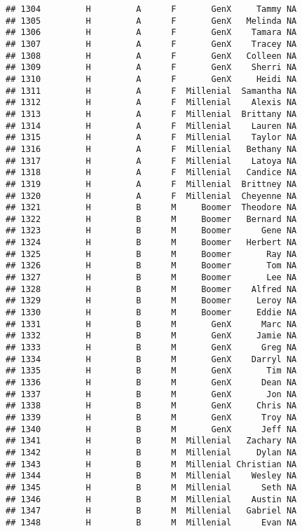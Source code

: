 \documentclass[
]{article}
\begin{document}
\begin{verbatim}
## 1304         H         A      F       GenX     Tammy NA
## 1305         H         A      F       GenX   Melinda NA
## 1306         H         A      F       GenX    Tamara NA
## 1307         H         A      F       GenX    Tracey NA
## 1308         H         A      F       GenX   Colleen NA
## 1309         H         A      F       GenX    Sherri NA
## 1310         H         A      F       GenX     Heidi NA
## 1311         H         A      F  Millenial  Samantha NA
## 1312         H         A      F  Millenial    Alexis NA
## 1313         H         A      F  Millenial  Brittany NA
## 1314         H         A      F  Millenial    Lauren NA
## 1315         H         A      F  Millenial    Taylor NA
## 1316         H         A      F  Millenial   Bethany NA
## 1317         H         A      F  Millenial    Latoya NA
## 1318         H         A      F  Millenial   Candice NA
## 1319         H         A      F  Millenial  Brittney NA
## 1320         H         A      F  Millenial  Cheyenne NA
## 1321         H         B      M     Boomer  Theodore NA
## 1322         H         B      M     Boomer   Bernard NA
## 1323         H         B      M     Boomer      Gene NA
## 1324         H         B      M     Boomer   Herbert NA
## 1325         H         B      M     Boomer       Ray NA
## 1326         H         B      M     Boomer       Tom NA
## 1327         H         B      M     Boomer       Lee NA
## 1328         H         B      M     Boomer    Alfred NA
## 1329         H         B      M     Boomer     Leroy NA
## 1330         H         B      M     Boomer     Eddie NA
## 1331         H         B      M       GenX      Marc NA
## 1332         H         B      M       GenX     Jamie NA
## 1333         H         B      M       GenX      Greg NA
## 1334         H         B      M       GenX    Darryl NA
## 1335         H         B      M       GenX       Tim NA
## 1336         H         B      M       GenX      Dean NA
## 1337         H         B      M       GenX       Jon NA
## 1338         H         B      M       GenX     Chris NA
## 1339         H         B      M       GenX      Troy NA
## 1340         H         B      M       GenX      Jeff NA
## 1341         H         B      M  Millenial   Zachary NA
## 1342         H         B      M  Millenial     Dylan NA
## 1343         H         B      M  Millenial Christian NA
## 1344         H         B      M  Millenial    Wesley NA
## 1345         H         B      M  Millenial      Seth NA
## 1346         H         B      M  Millenial    Austin NA
## 1347         H         B      M  Millenial   Gabriel NA
## 1348         H         B      M  Millenial      Evan NA

\end{verbatim}
\end{document}

